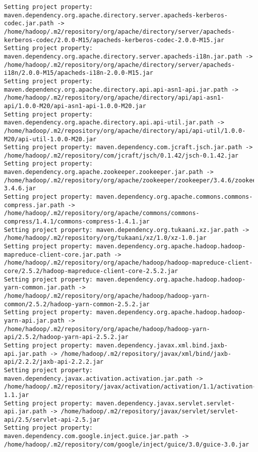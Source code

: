 \begin{verbatim}
Setting project property: maven.dependency.org.apache.directory.server.apacheds-kerberos-codec.jar.path -> /home/hadoop/.m2/repository/org/apache/directory/server/apacheds-kerberos-codec/2.0.0-M15/apacheds-kerberos-codec-2.0.0-M15.jar
Setting project property: maven.dependency.org.apache.directory.server.apacheds-i18n.jar.path -> /home/hadoop/.m2/repository/org/apache/directory/server/apacheds-i18n/2.0.0-M15/apacheds-i18n-2.0.0-M15.jar
Setting project property: maven.dependency.org.apache.directory.api.api-asn1-api.jar.path -> /home/hadoop/.m2/repository/org/apache/directory/api/api-asn1-api/1.0.0-M20/api-asn1-api-1.0.0-M20.jar
Setting project property: maven.dependency.org.apache.directory.api.api-util.jar.path -> /home/hadoop/.m2/repository/org/apache/directory/api/api-util/1.0.0-M20/api-util-1.0.0-M20.jar
Setting project property: maven.dependency.com.jcraft.jsch.jar.path -> /home/hadoop/.m2/repository/com/jcraft/jsch/0.1.42/jsch-0.1.42.jar
Setting project property: maven.dependency.org.apache.zookeeper.zookeeper.jar.path -> /home/hadoop/.m2/repository/org/apache/zookeeper/zookeeper/3.4.6/zookeeper-3.4.6.jar
Setting project property: maven.dependency.org.apache.commons.commons-compress.jar.path -> /home/hadoop/.m2/repository/org/apache/commons/commons-compress/1.4.1/commons-compress-1.4.1.jar
Setting project property: maven.dependency.org.tukaani.xz.jar.path -> /home/hadoop/.m2/repository/org/tukaani/xz/1.0/xz-1.0.jar
Setting project property: maven.dependency.org.apache.hadoop.hadoop-mapreduce-client-core.jar.path -> /home/hadoop/.m2/repository/org/apache/hadoop/hadoop-mapreduce-client-core/2.5.2/hadoop-mapreduce-client-core-2.5.2.jar
Setting project property: maven.dependency.org.apache.hadoop.hadoop-yarn-common.jar.path -> /home/hadoop/.m2/repository/org/apache/hadoop/hadoop-yarn-common/2.5.2/hadoop-yarn-common-2.5.2.jar
Setting project property: maven.dependency.org.apache.hadoop.hadoop-yarn-api.jar.path -> /home/hadoop/.m2/repository/org/apache/hadoop/hadoop-yarn-api/2.5.2/hadoop-yarn-api-2.5.2.jar
Setting project property: maven.dependency.javax.xml.bind.jaxb-api.jar.path -> /home/hadoop/.m2/repository/javax/xml/bind/jaxb-api/2.2.2/jaxb-api-2.2.2.jar
Setting project property: maven.dependency.javax.activation.activation.jar.path -> /home/hadoop/.m2/repository/javax/activation/activation/1.1/activation-1.1.jar
Setting project property: maven.dependency.javax.servlet.servlet-api.jar.path -> /home/hadoop/.m2/repository/javax/servlet/servlet-api/2.5/servlet-api-2.5.jar
Setting project property: maven.dependency.com.google.inject.guice.jar.path -> /home/hadoop/.m2/repository/com/google/inject/guice/3.0/guice-3.0.jar

\end{verbatim}
